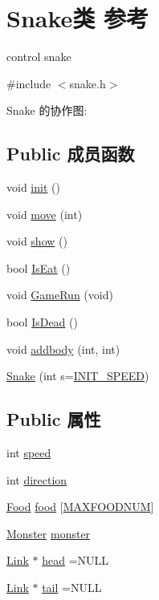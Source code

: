 \hypertarget{class_snake}{}\section{Snake类 参考}
\label{class_snake}


control snake  




{\ttfamily \#include $<$snake.\+h$>$}



Snake 的协作图\+:
\subsection*{Public 成员函数}
\begin{DoxyCompactItemize}
\item 
void \hyperlink{class_snake_ac9f00db4b693de3c552a0ae7275c8412}{init} ()
\item 
void \hyperlink{class_snake_a602fd6cb710af4a5e15785e82714d772}{move} (int)
\item 
void \hyperlink{class_snake_a1f55b539dbd69567f0af08d13d61389c}{show} ()
\item 
bool \hyperlink{class_snake_ae6e73811e36fa6e311d8d05ca339434e}{Is\+Eat} ()
\item 
void \hyperlink{class_snake_a0cf96a23372ed4b4242162583cea121c}{Game\+Run} (void)
\item 
bool \hyperlink{class_snake_aa2e54c02d9427ff0744c2fba74fb2985}{Is\+Dead} ()
\item 
void \hyperlink{class_snake_a035f93c5d5cc816fff092c3949b915fd}{addbody} (int, int)
\item 
\hyperlink{class_snake_a8854828745d765e3a96ec33ff96b501f}{Snake} (int s=\hyperlink{struct_8h_a1c65411e8b3e751f3cdb901bbcb50586}{I\+N\+I\+T\+\_\+\+S\+P\+E\+E\+D})
\end{DoxyCompactItemize}
\subsection*{Public 属性}
\begin{DoxyCompactItemize}
\item 
int \hyperlink{class_snake_a18db40ca997cae2a8be85987330010f1}{speed}
\item 
int \hyperlink{class_snake_a1349ccf7f145382b601ac41927f84af4}{direction}
\item 
\hyperlink{class_food}{Food} \hyperlink{class_snake_a2abf1fa22e67f5d911d973a5dea52f4d}{food} \mbox{[}\hyperlink{struct_8h_a71e3ddf030ea8633e937740a3339b969}{M\+A\+X\+F\+O\+O\+D\+N\+U\+M}\mbox{]}
\item 
\hyperlink{class_monster}{Monster} \hyperlink{class_snake_a28ed7a3049eb61c81bc3aef5487b6e3e}{monster}
\item 
\hyperlink{struct_link}{Link} $\ast$ \hyperlink{class_snake_a99959d37db34343d4d0c4a618e72fd43}{head} =N\+U\+L\+L
\item 
\hyperlink{struct_link}{Link} $\ast$ \hyperlink{class_snake_a7d6269120c57743dd7da9da7bf2c1bc4}{tail} =N\+U\+L\+L
\end{DoxyCompactItemize}


